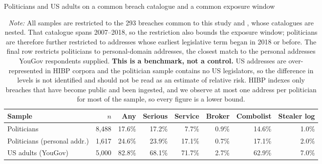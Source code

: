 \begin{table}[!htbp]
\centering
\footnotesize
\def\sym#1{\ifmmode^{#1}\else\(^{#1}\)\fi}
\caption{Politicians and US adults on a common breach catalogue and a common exposure window}
\label{tab:three_sample}
\begin{adjustbox}{max width=\linewidth}
\begin{tabular}{lrrrrrrr}
\toprule\toprule
Sample & $n$ & Any & Serious & Service & Broker & Combolist & Stealer log \\
\midrule
Politicians & 8,488 & 17.6\% & 17.2\% & 7.7\% & 0.9\% & 14.6\% & 1.0\% \\
Politicians (personal addr.) & 1,617 & 24.6\% & 23.9\% & 17.1\% & 0.7\% & 17.1\% & 2.0\% \\
US adults (YouGov) & 5,000 & 82.8\% & 68.1\% & 71.7\% & 2.7\% & 62.9\% & 7.0\% \\
\bottomrule
\end{tabular}
\end{adjustbox}
\caption*{\scriptsize \emph{Note:} All samples are restricted to the 293 breaches common to this study and \citet{sood2019pwned}, whose catalogues are nested. That catalogue spans 2007--2018, so the restriction also bounds the exposure window; politicians are therefore further restricted to addresses whose earliest legislative term began in 2018 or before. The final row restricts politicians to personal-domain addresses, the closest match to the personal addresses YouGov respondents supplied. \textbf{This is a benchmark, not a control.} US addresses are over-represented in HIBP corpora and the politician sample contains no US legislators, so the difference in levels is not identified and should not be read as an estimate of relative risk. HIBP indexes only breaches that have become public and been ingested, and we observe at most one address per politician for most of the sample, so every figure is a lower bound.}
\end{table}
